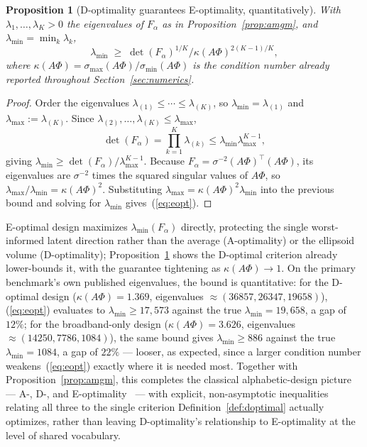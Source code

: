 \documentclass[11pt]{article}
\newtheorem{Proposition}{Proposition}
\begin{document}
\begin{Proposition}[D-optimality guarantees E-optimality, quantitatively]
\label{prop:eopt}
With $\lambda_1,\ldots,\lambda_K>0$ the eigenvalues of $F_\alpha$ as in Proposition~\ref{prop:amgm}, and $\lambda_{\min}=\min_k\lambda_k$,
\begin{equation}
\lambda_{\min} \;\ge\; \det(F_\alpha)^{1/K}\big/\kappa(A\Phi)^{2(K-1)/K},
\label{eq:eopt}
\end{equation}
where $\kappa(A\Phi)=\sigma_{\max}(A\Phi)/\sigma_{\min}(A\Phi)$ is the condition number already reported throughout Section~\ref{sec:numerics}.
\end{Proposition}
\begin{proof}
Order the eigenvalues $\lambda_{(1)}\le\cdots\le\lambda_{(K)}$, so $\lambda_{\min}=\lambda_{(1)}$ and $\lambda_{\max}:=\lambda_{(K)}$. Since $\lambda_{(2)},\ldots,\lambda_{(K)}\le\lambda_{\max}$,
\[
\det(F_\alpha)=\prod_{k=1}^K\lambda_{(k)}\le\lambda_{\min}\lambda_{\max}^{K-1},
\]
giving $\lambda_{\min}\ge\det(F_\alpha)/\lambda_{\max}^{K-1}$. Because $F_\alpha=\sigma^{-2}(A\Phi)^\top(A\Phi)$, its eigenvalues are $\sigma^{-2}$ times the squared singular values of $A\Phi$, so $\lambda_{\max}/\lambda_{\min}=\kappa(A\Phi)^2$. Substituting $\lambda_{\max}=\kappa(A\Phi)^2\lambda_{\min}$ into the previous bound and solving for $\lambda_{\min}$ gives~(\ref{eq:eopt}).
\end{proof}

E-optimal design maximizes $\lambda_{\min}(F_\alpha)$ directly, protecting the single worst-informed latent direction rather than the average (A-optimality) or the ellipsoid volume (D-optimality); Proposition~\ref{prop:eopt} shows the D-optimal criterion already lower-bounds it, with the guarantee tightening as $\kappa(A\Phi)\to1$. On the primary benchmark's own published eigenvalues, the bound is quantitative: for the D-optimal design ($\kappa(A\Phi)=1.369$, eigenvalues $\approx(36857,26347,19658)$), (\ref{eq:eopt}) evaluates to $\lambda_{\min}\ge17{,}573$ against the true $\lambda_{\min}=19{,}658$, a gap of $12\%$; for the broadband-only design ($\kappa(A\Phi)=3.626$, eigenvalues $\approx(14250,7786,1084)$), the same bound gives $\lambda_{\min}\ge886$ against the true $\lambda_{\min}=1084$, a gap of $22\%$ --- looser, as expected, since a larger condition number weakens~(\ref{eq:eopt}) exactly where it is needed most. Together with Proposition~\ref{prop:amgm}, this completes the classical alphabetic-design picture --- A-, D-, and E-optimality~\citep{ref3} --- with explicit, non-asymptotic inequalities relating all three to the single criterion Definition~\ref{def:doptimal} actually optimizes, rather than leaving D-optimality's relationship to E-optimality at the level of shared vocabulary.
\end{document}
